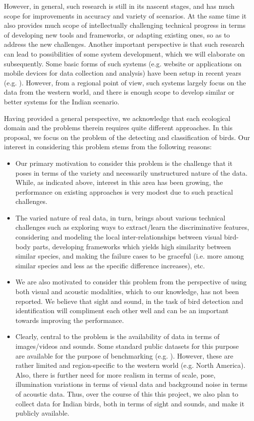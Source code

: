 \documentclass{article}
\begin{document}
However, in general, such research is still in its nascent stages, and has much scope for improvements in accuracy and variety of scenarios. At the same time it also provides much scope of intellectually challenging technical progress in terms of developing new tools and frameworks, or adapting existing ones, so as to address the new challenges. Another important perspective is that such research can lead to possibilities of some system development, which we will elaborate on subsequently. Some basic forms of such systems (e.g. website or applications on mobile devices for data collection and analysis) have been setup in recent years (e.g. \cite{birdsnap}). However, from a regional point of view, such systems largely focus on the data from the western world, and there is enough scope to develop similar or better systems for the Indian scenario. 

Having provided a general perspective, we acknowledge that each ecological domain and the problems therein requires quite different approaches. In this proposal, we focus on the problem of the detecting and classification of birds. Our interest in considering this problem stems from the following reasons: 
\begin{itemize}
\item Our primary motivation to consider this problem is the challenge that it poses in terms of the variety and necessarily unstructured nature of the data. While, as indicated above, interest in this area has been growing, the performance on existing approaches is very modest due to such practical challenges. 
\item The varied nature of real data, in turn, brings about various technical challenges such as exploring ways to extract/learn the discriminative features, considering and modeling the local inter-relationships between visual bird-body parts, developing frameworks which yields high similarity between similar species, and making the failure cases to be graceful (i.e. more among similar species and less as the specific difference increases), etc. 
\item We are also motivated to consider this problem from the perspective of using both visual and acoustic modalities, which to our knowledge, has not been reported. We believe that sight and sound, in the task of bird detection and identification will compliment each other well and can be an important towards improving the performance. 
\item Clearly, central to the problem is the availability of data in terms of
images/videos and sounds. Some standard public datasets for this purpose are
available for the purpose of benchmarking (e.g. \cite{cub}). However, these are
rather limited and region-specific to the western world (e.g. North America).
Also, there is further need for more realism in terms of scale, pose,
illumination variations in terms of visual data and background noise in terms of acoustic data. Thus, over the course of this this project, we also plan to collect data for Indian birds, both in terms of sight and sounds, and make it publicly available.
\end{itemize}
 
\end{document}
